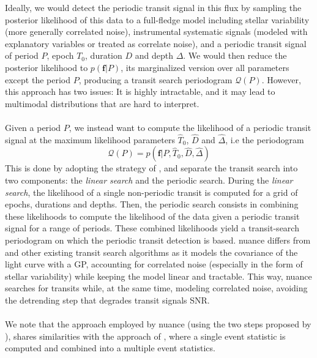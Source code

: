 \documentclass[modern]{aastex631}
\begin{document}
Ideally, we would detect the periodic transit signal in this flux by sampling the posterior likelihood of this data to a full-fledge model including stellar variability (more generally correlated noise), instrumental systematic signals (modeled with explanatory variables or treated as correlate noise), and a periodic transit signal of period $P$, epoch $T_0$, duration $D$ and depth $\Delta$. We would then reduce the posterior likelihood to $p(\bm{f}\vert P)$, its marginalized version over all parameters except the period $P$, producing a transit search periodogram $\mathcal{Q}(P)$. However, this approach has two issues: It is highly intractable, and it may lead to multimodal distributions that are hard to interpret.
\\\\
Given a period $P$, we instead want to compute the likelihood of a periodic transit signal at the maximum likelihood parameters $\hat T_0$, $\hat D$ and $\hat \Delta$, i.e the periodogram
\begin{equation}\label{eq:periodogram}
        \mathcal{Q}(P) = p(\bm{f} \vert P, \hat T_0 ,\hat D, \hat \Delta)
\end{equation}
This is done by adopting the strategy of \cite{foreman2016}, and separate the transit search into two components: the \textit{linear search} and the periodic search. During the \textit{linear search}, the likelihood of a single non-periodic transit is computed for a grid of epochs, durations and depths. Then, the periodic search consists in combining these likelihoods to compute the likelihood of the data given a periodic transit signal for a range of periods. These combined likelihoods yield a transit-search periodogram on which the periodic transit detection is based. \textsf{nuance} differs from \cite{foreman2016} and other existing transit search algorithms as it models the covariance of the light curve with a GP, accounting for correlated noise (especially in the form of stellar variability) while keeping the model linear and tractable. This way, \textsf{nuance} searches for transits while, at the same time, modeling correlated noise, avoiding the detrending step that degrades transit signals SNR.\\\\
We note that the approach employed by \textsf{nuance} (using the two steps proposed by \citealt{foreman2016}), shares similarities with the approach of \cite{Jenkins2010}, where a single event statistic is computed and combined into a multiple event statistics.
\end{document}
